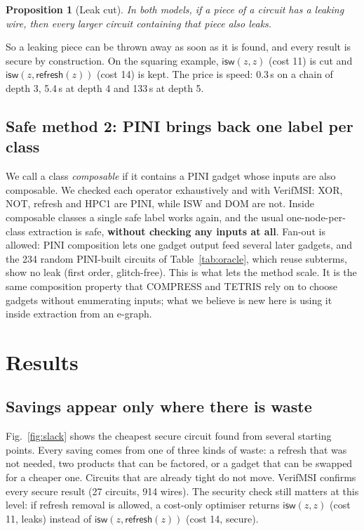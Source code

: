 \documentclass[conference]{IEEEtran}
\newtheorem{proposition}{Proposition}
\newcommand{\rf}{\mathsf{refresh}}
\newcommand{\isw}{\mathsf{isw}}
\begin{document}
\begin{proposition}[Leak cut]\label{prop:cut}
In both models, if a piece of a circuit has a leaking wire, then every larger circuit containing that piece also leaks.
\end{proposition}
So a leaking piece can be thrown away as soon as it is found, and every result is secure by construction. On the squaring example, $\isw(z,z)$ (cost 11) is cut and $\isw(z,\rf(z))$ (cost 14) is kept. The price is speed: 0.3\,s on a chain of depth 3, 5.4\,s at depth 4 and 133\,s at depth 5.

\subsection{Safe method 2: PINI brings back one label per class}
We call a class \emph{composable} if it contains a PINI gadget whose inputs are also composable. We checked each operator exhaustively and with VerifMSI: XOR, NOT, refresh and HPC1 are PINI, while ISW and DOM are not. Inside composable classes a single safe label works again, and the usual one-node-per-class extraction is safe, \textbf{without checking any inputs at all}. Fan-out is allowed: PINI composition lets one gadget output feed several later gadgets, and the 234 random PINI-built circuits of Table~\ref{tab:oracle}, which reuse subterms, show no leak (first order, glitch-free). This is what lets the method scale. It is the same composition property that COMPRESS and TETRIS rely on to choose gadgets without enumerating inputs; what we believe is new here is using it inside extraction from an e-graph.

\section{Results}\label{sec:results}
\subsection{Savings appear only where there is waste}
Fig.~\ref{fig:slack} shows the cheapest secure circuit found from several starting points. Every saving comes from one of three kinds of waste: a refresh that was not needed, two products that can be factored, or a gadget that can be swapped for a cheaper one. Circuits that are already tight do not move. VerifMSI confirms every secure result (27 circuits, 914 wires). The security check still matters at this level: if refresh removal is allowed, a cost-only optimiser returns $\isw(z,z)$ (cost 11, leaks) instead of $\isw(z,\rf(z))$ (cost 14, secure).
\end{document}
